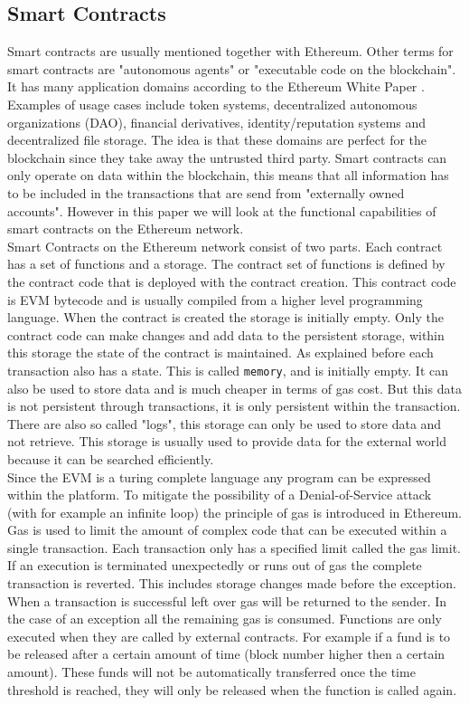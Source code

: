 \documentclass[a4paper]{article}
\begin{document}
\subsection{Smart Contracts}
Smart contracts are usually mentioned together with Ethereum. Other terms for smart contracts are "autonomous agents" or "executable code on the blockchain". It has many application domains according to the Ethereum White Paper \cite{buterin2013ethereum}. Examples of usage cases include token systems, decentralized autonomous organizations (DAO), financial derivatives, identity/reputation systems and decentralized file storage. The idea is that these domains are perfect for the blockchain since they take away the untrusted third party. Smart contracts can only operate on data within the blockchain, this means that all information has to be included in the transactions that are send from "externally owned accounts". However in this paper we will look at the functional capabilities of smart contracts on the Ethereum network. \\ 
Smart Contracts on the Ethereum network consist of two parts. Each contract has a set of functions and a storage. The contract set of functions is defined by the contract code that is deployed with the contract creation. This contract code is EVM bytecode and is usually compiled from a higher level programming language. When the contract is created the storage is initially empty. Only the contract code can make changes and add data to the persistent storage, within this storage the state of the contract is maintained. As explained before each transaction also has a state. This is called \texttt{memory}, and is initially empty. It can also be used to store data and is much cheaper in terms of gas cost. But this data is not persistent through transactions, it is only persistent within the transaction. There are also so called "logs", this storage can only be used to store data and not retrieve. This storage is usually used to provide data for the external world because it can be searched efficiently.\\
Since the EVM is a turing complete language any program can be expressed within the platform. To mitigate the possibility of a Denial-of-Service attack (with for example an infinite loop) the principle of gas is introduced in Ethereum. Gas is used to limit the amount of complex code that can be executed within a single transaction. Each transaction only has a specified limit called the gas limit. If an execution is terminated unexpectedly or runs out of gas the complete transaction is reverted. This includes storage changes made before the exception. When a transaction is successful left over gas will be returned to the sender. In the case of an exception all the remaining gas is consumed.
Functions are only executed when they are called by external contracts. For example if a fund is to be released after a certain amount of time (block number higher then a certain amount). These funds will not be automatically transferred once the time threshold is reached, they will only be released when the function is called again.\\
\end{document}
